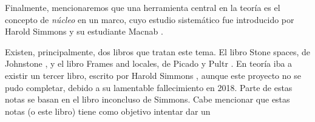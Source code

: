 Finalmente, mencionaremos que una herramienta central
en la teoría es el concepto de \emph{núcleo} en un marco,
cuyo estudio sistemático fue introducido por Harold Simmons \cite{simmons1978framework}
y su estudiante Macnab \cite{macnab198110}.

Existen, principalmente, dos libros que tratan este tema.
El libro Stone spaces, de Johnstone \cite{johnstone1986stone},
y el libro Frames and locales, de Picado y Pultr \cite{PicadoPultr}.
En teoría iba a existir un tercer libro, escrito por Harold Simmons ,
aunque este proyecto no se pudo completar, debido a su
lamentable fallecimiento en 2018.
Parte de estas notas se basan en el libro inconcluso de Simmons. 
Cabe mencionar que estas notas (o este libro) tiene como objetivo intentar dar un
%
%
